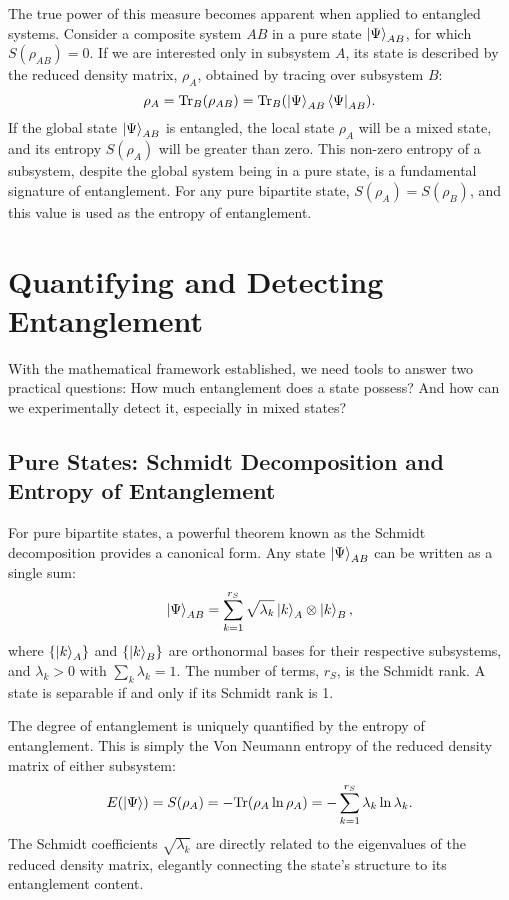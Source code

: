 The true power of this measure becomes apparent when applied to entangled
systems. Consider a composite system $AB$ in a pure state
$\ket{\Psi}_{AB}$, for which $S(\rho_{AB})=0$. If we are interested only in
subsystem $A$, its state is described by the reduced density matrix,
$\rho_A$, obtained by tracing over subsystem $B$:
\begin{equation}
	\rho_A = \mathrm{Tr}_B(\rho_{AB}) = \mathrm{Tr}_B(\ket{\Psi}_{AB}\bra{\Psi}_{AB}).
\end{equation}
If the global state $\ket{\Psi}_{AB}$ is entangled, the local state $\rho_A$
will be a mixed state, and its entropy $S(\rho_A)$ will be greater than zero.
This non-zero entropy of a subsystem, despite the global system being in a
pure state, is a fundamental signature of entanglement. For any pure
bipartite state, $S(\rho_A) = S(\rho_B)$, and this value is used as the
entropy of entanglement.

\section{Quantifying and Detecting Entanglement}
\label{sec:quantifying_detecting}

With the mathematical framework established, we need tools to answer two
practical questions: How much entanglement does a state possess? And how can
we experimentally detect it, especially in mixed states?

\subsection{Pure States: Schmidt Decomposition and Entropy of Entanglement}
\label{sub:pure_state_measures}

For pure bipartite states, a powerful theorem known as the
Schmidt decomposition provides a canonical form. Any state
$\ket{\Psi}_{AB}$ can be written as a single sum:
\begin{equation}
	\ket{\Psi}_{AB} = \sum_{k=1}^{r_S} \sqrt{\lambda_k} \ket{k}_A \otimes \ket{k}_B,
\end{equation}
where $\{\ket{k}_A\}$ and $\{\ket{k}_B\}$ are orthonormal bases for their
respective subsystems, and $\lambda_k > 0$ with $\sum_k \lambda_k = 1$. The
number of terms, $r_S$, is the Schmidt rank. A state is separable if
and only if its Schmidt rank is 1.

The degree of entanglement is uniquely quantified by the
entropy of entanglement. This is simply the Von Neumann entropy of
the reduced density matrix of either subsystem:
\begin{equation}
	E(\ket{\Psi}) = S(\rho_A) = -\mathrm{Tr}(\rho_A \ln \rho_A) = -\sum_{k=1}^{r_S} \lambda_k \ln \lambda_k.
\end{equation}
The Schmidt coefficients $\sqrt{\lambda_k}$ are directly related to the
eigenvalues of the reduced density matrix, elegantly connecting the
state's structure to its entanglement content.

